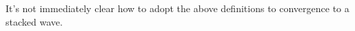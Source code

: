 \documentclass{article}
\theoremstyle{definition}
\newtheorem{proposition}[theorem]{Proposition}
\numberwithin{equation}{section}
\begin{document}
It's not immediately clear how to adopt the above definitions to convergence to a stacked wave.


\end{document}
